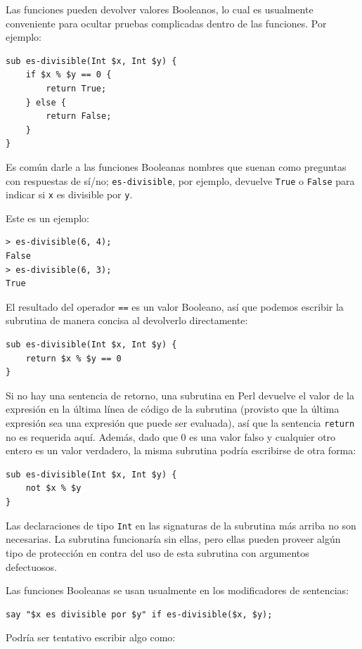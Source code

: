 Las funciones pueden devolver valores Booleanos, lo cual es usualmente
conveniente para ocultar pruebas complicadas dentro de las funciones. Por
ejemplo:

\begin{verbatim}
sub es-divisible(Int $x, Int $y) {
    if $x % $y == 0 {
        return True;
    } else {
        return False;
    }
}
\end{verbatim}
%
Es común darle a las funciones Booleanas nombres que suenan como
preguntas con respuestas de sí/no; \verb|es-divisible|, por ejemplo,
devuelve {\tt True} o {\tt False} para indicar si {\tt x} es divisible
por {\tt y}.

Este es un ejemplo:

\begin{verbatim}
> es-divisible(6, 4);
False
> es-divisible(6, 3);
True
\end{verbatim}
%
El resultado del operador {\tt ==} es un valor Booleano,
así que podemos escribir la subrutina de manera concisa al 
devolverlo directamente:

\begin{verbatim}
sub es-divisible(Int $x, Int $y) {
    return $x % $y == 0
}
\end{verbatim}
%
Si no hay una sentencia de retorno, una subrutina en Perl devuelve
el valor de la expresión en la última línea de código de la 
subrutina (provisto que la última expresión sea una expresión
que puede ser evaluada), así que la sentencia {\tt return} no 
es requerida aquí. Además, dado que 0 es una valor falso y cualquier 
otro entero es un valor verdadero, la misma subrutina podría escribirse
de otra forma:

\begin{verbatim}
sub es-divisible(Int $x, Int $y) { 
    not $x % $y 
}
\end{verbatim}

Las declaraciones de tipo {\tt Int} en las signaturas de la subrutina
más arriba no son necesarias. La subrutina funcionaría sin ellas, pero
ellas pueden proveer algún tipo de protección en contra del uso 
de esta subrutina con argumentos defectuosos.

Las funciones Booleanas se usan usualmente en los 
modificadores de sentencias:

\begin{verbatim}
say "$x es divisible por $y" if es-divisible($x, $y);
\end{verbatim}
%
Podría ser tentativo escribir algo como:

